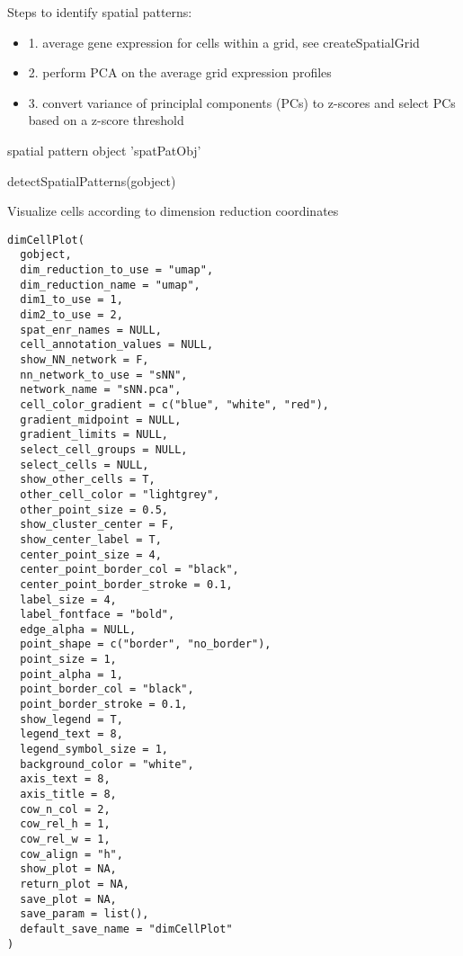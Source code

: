 \documentclass[a4paper]{book}
\begin{document}
%
\begin{Details}\relax
Steps to identify spatial patterns:
\begin{itemize}

\item{} 1. average gene expression for cells within a grid, see createSpatialGrid
\item{} 2. perform PCA on the average grid expression profiles
\item{} 3. convert variance of principlal components (PCs) to z-scores and select PCs based on a z-score threshold

\end{itemize}

\end{Details}
%
\begin{Value}
spatial pattern object 'spatPatObj'
\end{Value}
%
\begin{Examples}
\begin{ExampleCode}
    detectSpatialPatterns(gobject)
\end{ExampleCode}
\end{Examples}
%
\begin{Description}\relax
Visualize cells according to dimension reduction coordinates
\end{Description}
%
\begin{Usage}
\begin{verbatim}
dimCellPlot(
  gobject,
  dim_reduction_to_use = "umap",
  dim_reduction_name = "umap",
  dim1_to_use = 1,
  dim2_to_use = 2,
  spat_enr_names = NULL,
  cell_annotation_values = NULL,
  show_NN_network = F,
  nn_network_to_use = "sNN",
  network_name = "sNN.pca",
  cell_color_gradient = c("blue", "white", "red"),
  gradient_midpoint = NULL,
  gradient_limits = NULL,
  select_cell_groups = NULL,
  select_cells = NULL,
  show_other_cells = T,
  other_cell_color = "lightgrey",
  other_point_size = 0.5,
  show_cluster_center = F,
  show_center_label = T,
  center_point_size = 4,
  center_point_border_col = "black",
  center_point_border_stroke = 0.1,
  label_size = 4,
  label_fontface = "bold",
  edge_alpha = NULL,
  point_shape = c("border", "no_border"),
  point_size = 1,
  point_alpha = 1,
  point_border_col = "black",
  point_border_stroke = 0.1,
  show_legend = T,
  legend_text = 8,
  legend_symbol_size = 1,
  background_color = "white",
  axis_text = 8,
  axis_title = 8,
  cow_n_col = 2,
  cow_rel_h = 1,
  cow_rel_w = 1,
  cow_align = "h",
  show_plot = NA,
  return_plot = NA,
  save_plot = NA,
  save_param = list(),
  default_save_name = "dimCellPlot"
)
\end{verbatim}
\end{Usage}
\end{document}
